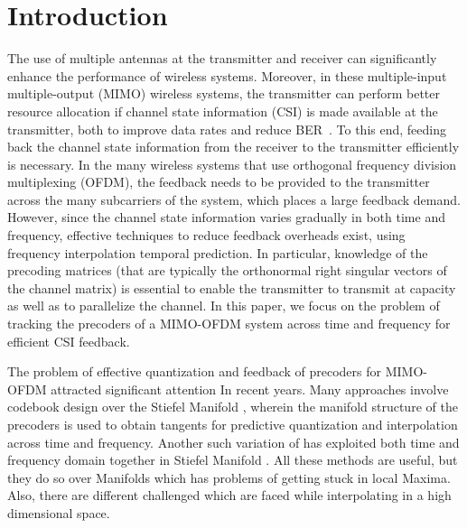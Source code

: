\documentclass[conference]{IEEEtran}
\begin{document}
  

\section{Introduction} 
\label{intro}

The use of multiple antennas at the transmitter and receiver can significantly enhance the performance of wireless systems. Moreover, in these multiple-input multiple-output (MIMO) wireless systems, the transmitter can perform better resource allocation if channel state information (CSI) is made available at the transmitter, both to improve data rates and reduce BER~\cite{love2008overview}. To this end, feeding back the channel state information from the receiver to the transmitter efficiently is necessary. In the many wireless systems that use orthogonal frequency division multiplexing (OFDM), the feedback needs to be provided to the transmitter across the many subcarriers of the system, which places a large feedback demand. However, since the channel state information varies gradually in both time and frequency, effective techniques to reduce feedback overheads exist, using frequency interpolation temporal prediction. In particular, knowledge of the precoding matrices (that are typically the orthonormal right singular vectors of the channel matrix) is essential to enable the transmitter to transmit at capacity as well as to parallelize the channel. In this paper, we focus on the problem of tracking the precoders of a MIMO-OFDM system across time and frequency for efficient CSI feedback. 

  


The problem of effective quantization and feedback of precoders for MIMO-OFDM attracted significant attention In recent years. Many approaches involve codebook design over the Stiefel Manifold \cite{6891198}, wherein the manifold structure of the precoders is used to obtain tangents for predictive quantization and interpolation across time and frequency. Another such variation of \cite{6891198} has exploited both time and frequency domain together in Stiefel Manifold \cite{Gupt1905:Predictive}. All these methods are useful, but they do so over Manifolds which has problems of getting stuck in local Maxima. Also, there are different challenged which are faced while interpolating in a high dimensional space. 
\end{document}
